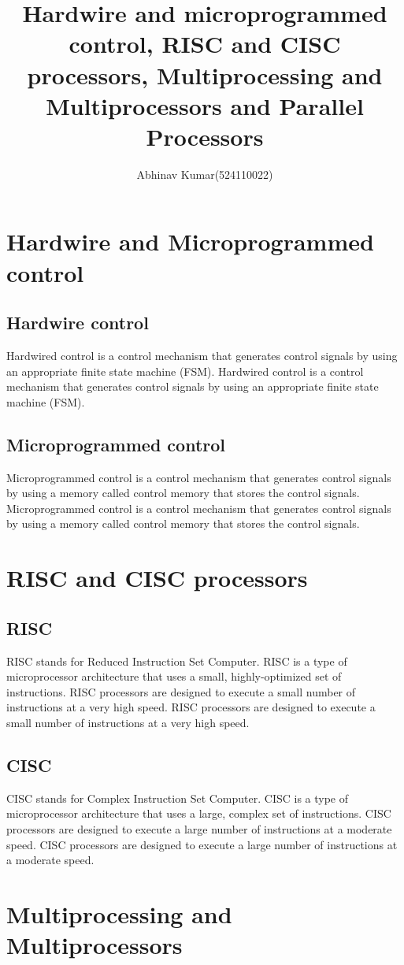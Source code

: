 \documentclass{article}
\title{Hardwire and microprogrammed control, RISC and CISC processors, Multiprocessing and Multiprocessors and Parallel Processors}
\author{Abhinav Kumar(524110022)}
\begin{document}
\maketitle
\newpage
\section*{Hardwire and Microprogrammed control}
\subsection*{Hardwire control}
Hardwired control is a control mechanism that generates control signals by using an appropriate finite state machine (FSM). Hardwired control is a control mechanism that generates control signals by using an appropriate finite state machine (FSM).
\subsection*{Microprogrammed control}
Microprogrammed control is a control mechanism that generates control signals by using a memory called control memory that stores the control signals. Microprogrammed control is a control mechanism that generates control signals by using a memory called control memory that stores the control signals.
\section*{RISC and CISC processors}
\subsection*{RISC}
RISC stands for Reduced Instruction Set Computer. RISC is a type of microprocessor architecture that uses a small, highly-optimized set of instructions. RISC processors are designed to execute a small number of instructions at a very high speed. RISC processors are designed to execute a small number of instructions at a very high speed.
\subsection*{CISC}
CISC stands for Complex Instruction Set Computer. CISC is a type of microprocessor architecture that uses a large, complex set of instructions. CISC processors are designed to execute a large number of instructions at a moderate speed. CISC processors are designed to execute a large number of instructions at a moderate speed.
\section*{Multiprocessing and Multiprocessors}
\end{document}
